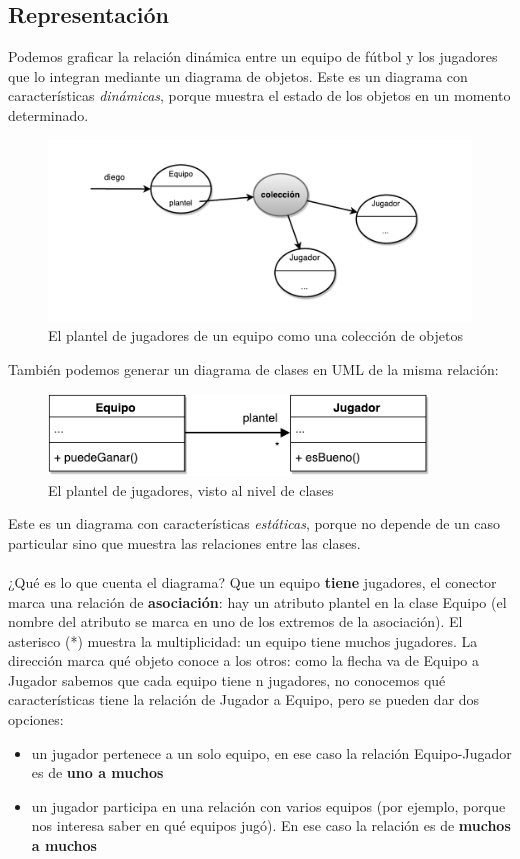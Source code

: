\documentclass[a4paper,12pt]{book}
\begin{document}
\subsection{Representación}
Podemos graficar la relación dinámica entre un equipo de fútbol y los jugadores que lo integran mediante un diagrama
de objetos. Este es un diagrama con características \textit{dinámicas}, porque muestra el estado 
de los objetos en un momento determinado.
\\
\begin{figure}[h!]
    \centering
    \includegraphics[width=1.1\textwidth]{images/02_Diagrama_Objetos_Equipo.pdf}
    \caption{El plantel de jugadores de un equipo como una colección de objetos}
\end{figure}
\FloatBarrier
También podemos generar un diagrama de clases en UML de la misma relación:
\begin{figure}[h!]
    \centering	
    \includegraphics[width=0.9\textwidth]{images/03_Diagrama_Clases_Equipo.pdf}
    \caption{El plantel de jugadores, visto al nivel de clases}
\end{figure}
\FloatBarrier
Este es un diagrama con características \textit{estáticas}, porque no depende de un caso particular
sino que muestra las relaciones entre las clases.\\
\\
¿Qué es lo que cuenta el diagrama? Que un equipo \textbf{tiene} jugadores, el conector marca una relación
de \textbf{asociación}: hay un atributo plantel en la clase Equipo (el nombre del atributo se marca en uno
de los extremos de la asociación). El asterisco (*) muestra la multiplicidad: un equipo tiene muchos jugadores.
La dirección marca qué objeto conoce a los otros: como la flecha va de Equipo a Jugador sabemos que cada equipo
tiene n jugadores, no conocemos qué características tiene la relación de Jugador a Equipo, pero se pueden dar
dos opciones:
\begin{itemize}
\item un jugador pertenece a un solo equipo, en ese caso la relación Equipo-Jugador es de \textbf{uno a muchos}
\item un jugador participa en una relación con varios equipos (por ejemplo, porque nos interesa saber
en qué equipos jugó). En ese caso la relación es de \textbf{muchos a muchos}
\end{itemize}
\end{document}
